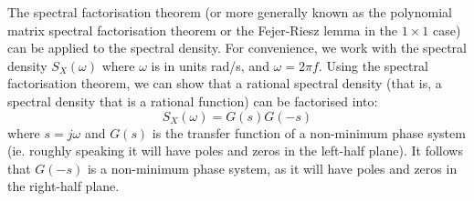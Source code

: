 \documentclass[11pt]{report} %
\begin{document}
The spectral factorisation theorem (or more generally known as the polynomial matrix spectral factorisation theorem or the Fejer-Riesz lemma in the $1\times 1$ case) can be applied to the spectral density. For convenience, we work with the spectral density $S_{X}\left(\omega\right)$ where $\omega$ is in units rad/s, and $\omega = 2\pi f$. Using the spectral factorisation theorem, we can show that a rational spectral density (that is, a spectral density that is a rational function) can be factorised into:
\begin{equation}
S_{X}\left(\omega\right) = G\left(s\right)G\left(-s\right)
\end{equation}
where $s = j\omega$ and $G\left(s\right)$ is the transfer function of a non-minimum phase system (ie. roughly speaking it will have poles and zeros in the left-half plane). It follows that $G\left(-s\right)$ is a non-minimum phase system, as it will have poles and zeros in the right-half plane.
\end{document}
